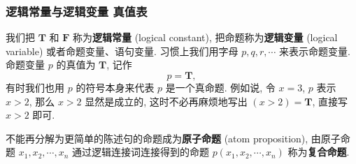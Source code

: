 \documentclass[10pt,UTF8]{book} %
\begin{document}









\subsubsection{逻辑常量与逻辑变量 \quad 真值表}

我们把 $\mathbf{T}$ 和 $\mathbf{F}$ 称为\textbf{逻辑常量} (logical constant),
把命题称为\textbf{逻辑变量} (logical variable) 或者命题变量、语句变量. 习惯上我们用字母
$p,q,r, \cdots$ 来表示命题变量. 命题变量 $p$ 的真值为 $\mathbf{T}$, 记作
\[ p = \mathbf{T}, \]
有时我们也用 $p$ 的符号本身来代表 $p$ 是一个真命题. 例如说, 令 $x=3$, $p$ 表示 $x>2$, 
那么 $x>2$ 显然是成立的, 这时不必再麻烦地写出 $(x>2) = \mathbf{T}$, 直接写 $x>2$ 即可.

不能再分解为更简单的陈述句的命题成为\textbf{原子命题} (atom proposition),
由原子命题 $x_1, x_2, \cdots, x_n$ 通过逻辑连接词连接得到的命题
$p(x_1, x_2, \cdots, x_n)$ 称为\textbf{复合命题}. 
\end{document}
